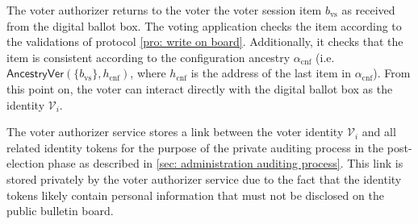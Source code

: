 The voter authorizer returns to the voter the voter session item $b_\mathrm{vs}$ as received from the digital ballot box. The voting application checks the item according to the validations of protocol \ref{pro: write on board}. Additionally, it checks that the item is consistent according to the configuration ancestry $\alpha_\mathrm{cnf}$ (i.e. $\mathsf{AncestryVer}(\{ b_\mathrm{vs} \}, h_\mathrm{cnf})$, where $h_\mathrm{cnf}$ is the address of the last item in $\alpha_\mathrm{cnf}$). From this point on, the voter can interact directly with the digital ballot box as the identity $\mathcal{V}_i$.

The voter authorizer service stores a link between the voter identity $\mathcal{V}_i$ and all related identity tokens for the purpose of the private auditing process in the post-election phase as described in \cref{sec: administration auditing process}. This link is stored privately by the voter authorizer service due to the fact that the identity tokens likely contain personal information that must not be disclosed on the public bulletin board.


